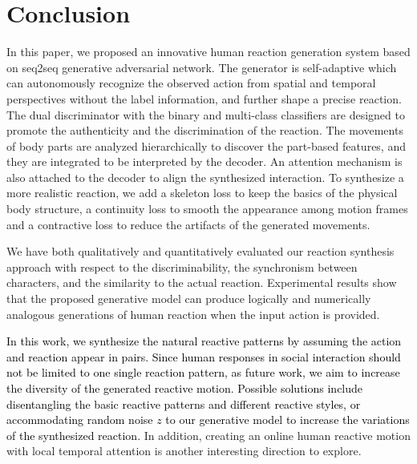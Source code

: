 \documentclass[times,twocolumn,final]{elsarticle}
\begin{document}
\section{Conclusion}
\label{sec:conclusion}
In this paper, we proposed an innovative human reaction generation system based on seq2seq generative adversarial network. The generator is self-adaptive which can autonomously recognize the observed action from spatial and temporal perspectives without the label information, and further shape a precise reaction. The dual discriminator with the binary and multi-class classifiers are designed to promote the authenticity and the discrimination of the reaction. The movements of body parts are analyzed hierarchically to discover the part-based features, and they are integrated to be interpreted by the decoder. An attention mechanism is also attached to the decoder to align the synthesized interaction. To synthesize a more realistic reaction, we add a skeleton loss to keep the basics of the physical body structure, a continuity loss to smooth the appearance among motion frames and a contractive loss to reduce the artifacts of the generated movements. 

We have both qualitatively and quantitatively evaluated our reaction synthesis approach with respect to the discriminability, the synchronism between characters, and the similarity to the actual reaction. Experimental results show that the proposed generative model can produce logically and numerically analogous generations of human reaction when the input action is provided.



\textcolor{black}{In this work, we synthesize the natural reactive patterns by assuming the action and reaction appear in pairs. Since human responses in social interaction should not be limited to one single reaction pattern, as future work, we aim to increase the diversity of the generated reactive motion. Possible solutions include disentangling the basic reactive patterns and different reactive styles, or accommodating random noise $z$ to our generative model to increase the variations of the synthesized reaction.} In addition, creating an online human reactive motion with local temporal attention is another interesting direction to explore.
\end{document}
